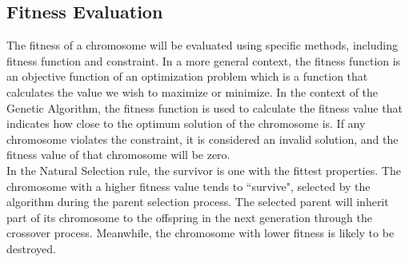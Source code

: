 \documentclass[12pt,oneside,openright,a4paper]{cpe-english-project}
\begin{document}
\subsection{Fitness Evaluation}
	The fitness of a chromosome will be evaluated using specific methods, including fitness function and constraint. In a more general context, the fitness function is an objective function of an optimization problem which is a function that calculates the value we wish to maximize or minimize. In the context of the Genetic Algorithm, the fitness function is used to calculate the fitness value that indicates how close to the optimum solution of the chromosome is. If any chromosome violates the constraint, it is considered an invalid solution, and the fitness value of that chromosome will be zero.   \\
	In the Natural Selection rule, the survivor is one with the fittest properties. The chromosome with a higher fitness value tends to ``survive", selected by the algorithm during the parent selection process. The selected parent will inherit part of its chromosome to the offspring in the next generation through the crossover process. Meanwhile, the chromosome with lower fitness is likely to be destroyed.


\end{document}
